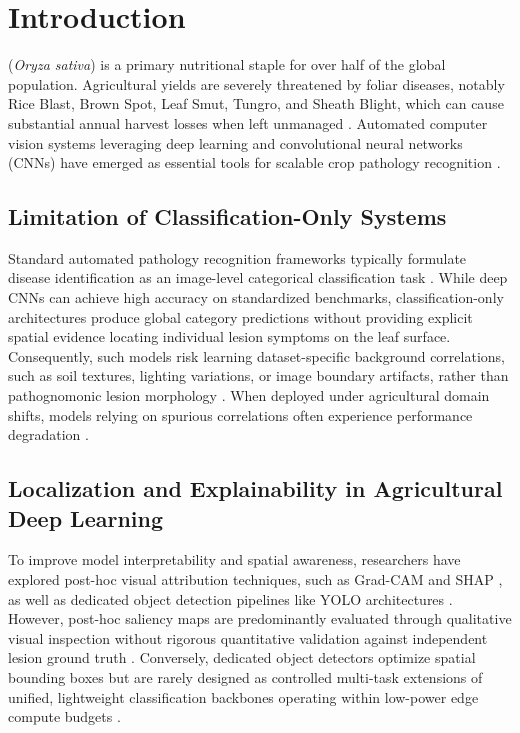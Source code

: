 \section{Introduction}
\label{sec:introduction}

 (\textit{Oryza sativa}) is a primary nutritional staple for over half of the global population. Agricultural yields are severely threatened by foliar diseases, notably Rice Blast, Brown Spot, Leaf Smut, Tungro, and Sheath Blight, which can cause substantial annual harvest losses when left unmanaged \cite{ref2, ref15}. Automated computer vision systems leveraging deep learning and convolutional neural networks (CNNs) have emerged as essential tools for scalable crop pathology recognition \cite{ref4, ref10, ref19}.

\subsection{Limitation of Classification-Only Systems}
Standard automated pathology recognition frameworks typically formulate disease identification as an image-level categorical classification task \cite{ref2, ref16, ref17}. While deep CNNs can achieve high accuracy on standardized benchmarks, classification-only architectures produce global category predictions without providing explicit spatial evidence locating individual lesion symptoms on the leaf surface. Consequently, such models risk learning dataset-specific background correlations, such as soil textures, lighting variations, or image boundary artifacts, rather than pathognomonic lesion morphology \cite{ref4, ref6}. When deployed under agricultural domain shifts, models relying on spurious correlations often experience performance degradation \cite{ref6, ref8}.

\subsection{Localization and Explainability in Agricultural Deep Learning}
To improve model interpretability and spatial awareness, researchers have explored post-hoc visual attribution techniques, such as Grad-CAM and SHAP \cite{ref4, ref5, ref7}, as well as dedicated object detection pipelines like YOLO architectures \cite{ref1, ref12}. However, post-hoc saliency maps are predominantly evaluated through qualitative visual inspection without rigorous quantitative validation against independent lesion ground truth \cite{ref4, ref7}. Conversely, dedicated object detectors optimize spatial bounding boxes but are rarely designed as controlled multi-task extensions of unified, lightweight classification backbones operating within low-power edge compute budgets \cite{ref1, ref3, ref14}.

